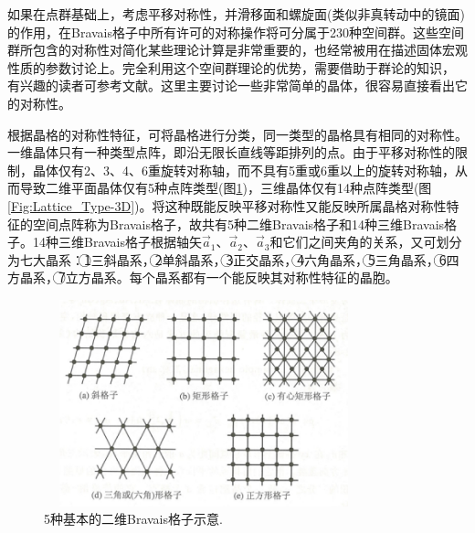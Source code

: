 如果在点群基础上，考虑平移对称性，并滑移面和螺旋面(类似非真转动中的镜面)的作用，在Bravais格子中所有许可的对称操作将可分属于230种空间群。这些空间群所包含的对称性对简化某些理论计算是非常重要的，也经常被用在描述固体宏观性质的参数讨论上。完全利用这个空间群理论的优势，需要借助于群论的知识，%
有兴趣的读者可参考文献。这里主要讨论一些非常简单的晶体，很容易直接看出它的对称性。

根据晶格的对称性特征，可将晶格进行分类，同一类型的晶格具有相同的对称性。一维晶体只有一种类型点阵，即沿无限长直线等距排列的点。由于平移对称性的限制，晶体仅有2、3、4、6重旋转对称轴，而不具有5重或6重以上的旋转对称轴，从而导致二维平面晶体仅有5种点阵类型(图\ref{Fig:Lattice_Type-2D})，三维晶体仅有14种点阵类型(图\ref{Fig:Lattice_Type-3D})。将这种既能反映平移对称性又能反映所属晶格对称性特征的空间点阵称为Bravais格子，故共有5种二维Bravais格子和14种三维Bravais格子。14种三维Bravais格子根据轴矢$\vec a_1$、$\vec a_2$、$\vec a_3$和它们之间夹角的关系，又可划分为七大晶系：\textcircled{1}三斜晶系，\textcircled{2}单斜晶系，\textcircled{3}正交晶系，\textcircled{4}六角晶系，\textcircled{5}三角晶系，\textcircled{6}四方晶系，\textcircled{7}立方晶系。每个晶系都有一个能反映其对称性特征的晶胞。
\begin{figure}[h!]
\centering
\vspace*{-0.05in}
\includegraphics[height=2.35in,width=3.65in,viewport=0 0 90 60,clip]{Figures/Bravais_Lattice-2D.jpg}
\caption{\small \textrm{5种基本的二维Bravais格子示意.}}%
\label{Fig:Lattice_Type-2D}
\end{figure}

